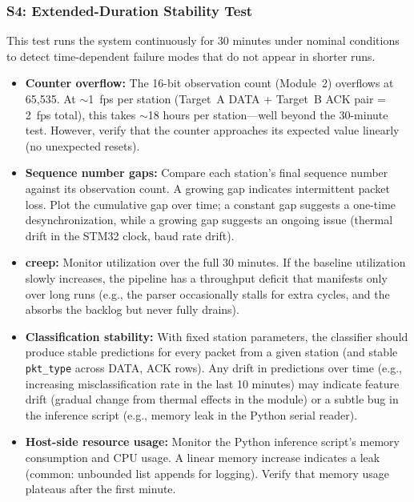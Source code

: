 \documentclass[11pt,letterpaper]{article}
\begin{document}
	\subsubsection{S4: Extended-Duration Stability Test}

	This test runs the system continuously for 30 minutes under nominal conditions to detect time-dependent failure modes that do not appear in shorter runs.

	\begin{tcolorbox}[infobox={What to Watch For During S4}]
		\begin{itemize}
			\item \textbf{Counter overflow:} The 16-bit observation count (Module~2) overflows at 65,535. At $\sim$1~fps per station (Target~A DATA + Target~B ACK pair = 2~fps total), this takes $\sim$18 hours per station---well beyond the 30-minute test. However, verify that the counter approaches its expected value linearly (no unexpected resets).
			\item \textbf{Sequence number gaps:} Compare each station's final sequence number against its observation count. A growing gap indicates intermittent packet loss. Plot the cumulative gap over time; a constant gap suggests a one-time desynchronization, while a growing gap suggests an ongoing issue (thermal drift in the STM32 clock, \UART{} baud rate drift).
			\item \textbf{\FIFO{} creep:} Monitor \FIFO{} utilization over the full 30 minutes. If the baseline utilization slowly increases, the pipeline has a throughput deficit that manifests only over long runs (e.g., the parser occasionally stalls for extra cycles, and the \FIFO{} absorbs the backlog but never fully drains).
			\item \textbf{Classification stability:} With fixed station parameters, the classifier should produce stable predictions for every packet from a given station (and stable \texttt{pkt\_type} across DATA, ACK rows). Any drift in predictions over time (e.g., increasing misclassification rate in the last 10 minutes) may indicate feature drift (gradual \RSSI{} change from thermal effects in the \RF{} module) or a subtle bug in the inference script (e.g., memory leak in the Python serial reader).
			\item \textbf{Host-side resource usage:} Monitor the Python inference script's memory consumption and CPU usage. A linear memory increase indicates a leak (common: unbounded list appends for logging). Verify that memory usage plateaus after the first minute.
		\end{itemize}
	\end{tcolorbox}
\end{document}
